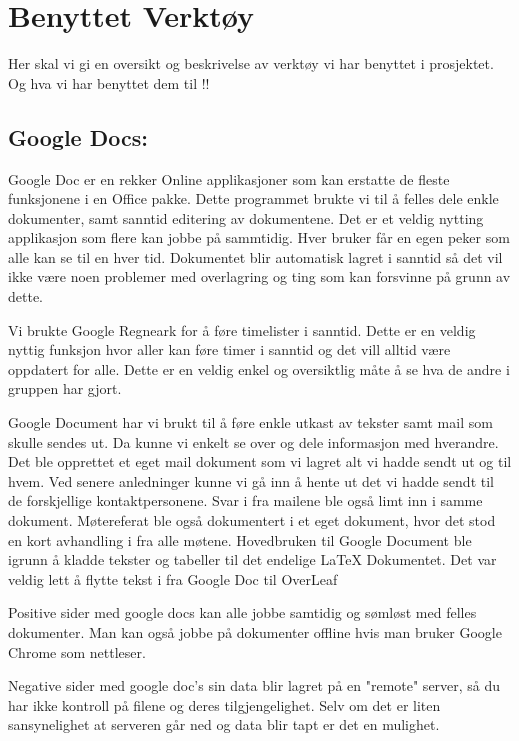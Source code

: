 \cleardoublepage
\chapter{Benyttet Verktøy}

{\color{green} Her skal vi gi en oversikt og beskrivelse av verktøy vi har benyttet i prosjektet. Og hva vi har benyttet dem til !! 
 }
\newline

\section{Google Docs:}

Google Doc er en rekker Online applikasjoner som kan erstatte de fleste funksjonene i en Office pakke. Dette programmet brukte vi til å felles dele enkle dokumenter, samt sanntid editering av dokumentene.\cite {Googledocs} Det er et veldig nytting applikasjon som flere kan jobbe på sammtidig. Hver bruker får en egen peker som alle kan se til en hver tid. Dokumentet blir automatisk lagret i sanntid så det vil ikke være noen problemer med overlagring og ting som kan forsvinne på grunn av dette.

Vi brukte Google Regneark for å føre timelister i sanntid. Dette er en veldig nyttig funksjon hvor aller kan føre timer i sanntid og det vill alltid være oppdatert for alle. Dette er en veldig enkel og oversiktlig måte å se hva de andre i gruppen har gjort.

Google Document har vi brukt til å føre enkle utkast av tekster samt mail som skulle sendes ut. Da kunne vi enkelt se over og dele informasjon med hverandre. Det ble opprettet et eget mail dokument som vi lagret alt vi hadde sendt ut og til hvem. Ved senere anledninger kunne vi gå inn å hente ut det vi hadde sendt til de forskjellige kontaktpersonene. Svar i fra mailene ble også limt inn i samme dokument.
Møtereferat ble også dokumentert i et eget dokument, hvor det stod en kort avhandling i fra alle møtene.
Hovedbruken til Google Document ble igrunn å kladde tekster og tabeller til det endelige LaTeX Dokumentet. Det var veldig lett å flytte tekst i fra Google Doc til OverLeaf 



Positive sider med google docs kan alle jobbe samtidig og sømløst med felles dokumenter. Man kan også jobbe på dokumenter offline hvis man bruker Google Chrome som nettleser.

Negative sider med google doc's sin data blir lagret på en "remote" server, så du har ikke kontroll på filene og deres tilgjengelighet. Selv om det er liten sansynelighet at serveren går ned og data blir tapt er det en mulighet.



